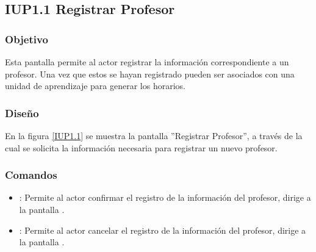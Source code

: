 \subsection{IUP1.1 Registrar Profesor}

\subsubsection{Objetivo}
	Esta pantalla permite al actor registrar la información correspondiente a un profesor. Una vez que estos se hayan registrado pueden ser asociados con una unidad de aprendizaje para generar los horarios.

\subsubsection{Diseño}

    En la figura \ref{IUP1.1} se muestra la pantalla ''Registrar Profesor'', a través de la cual se solicita la información necesaria para registrar un nuevo profesor.
 

\subsubsection{Comandos}
    \begin{itemize}
	\item {}: Permite al actor confirmar el registro de la información del profesor, dirige a la pantalla .
	
	\item {}: Permite al actor cancelar el registro de la información del profesor, dirige a la pantalla .
    \end{itemize}

